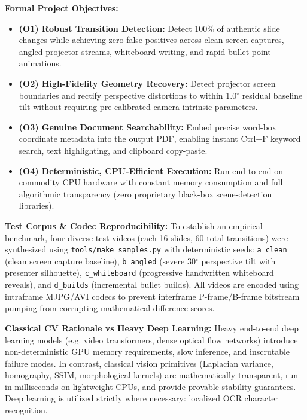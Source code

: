 \documentclass[10pt,a4paper]{article}
\begin{document}
\textbf{Formal Project Objectives:}
\begin{itemize}[leftmargin=6mm, itemsep=1pt, topsep=2pt]
  \item \textbf{(O1) Robust Transition Detection:} Detect 100\% of authentic slide changes while achieving zero false positives across clean screen captures, angled projector streams, whiteboard writing, and rapid bullet-point animations.
  \item \textbf{(O2) High-Fidelity Geometry Recovery:} Detect projector screen boundaries and rectify perspective distortions to within 1.0$^\circ$ residual baseline tilt without requiring pre-calibrated camera intrinsic parameters.
  \item \textbf{(O3) Genuine Document Searchability:} Embed precise word-box coordinate metadata into the output PDF, enabling instant Ctrl+F keyword search, text highlighting, and clipboard copy-paste.
  \item \textbf{(O4) Deterministic, CPU-Efficient Execution:} Run end-to-end on commodity CPU hardware with constant memory consumption and full algorithmic transparency (zero proprietary black-box scene-detection libraries).
\end{itemize}

\textbf{Test Corpus \& Codec Reproducibility:} To establish an empirical benchmark, four diverse test videos (each 16 slides, 60 total transitions) were synthesized using \texttt{tools/make\_samples.py} with deterministic seeds: \texttt{a\_clean} (clean screen capture baseline), \texttt{b\_angled} (severe 30$^\circ$ perspective tilt with presenter silhouette), \texttt{c\_whiteboard} (progressive handwritten whiteboard reveals), and \texttt{d\_builds} (incremental bullet builds). All videos are encoded using intraframe MJPG/AVI codecs to prevent interframe P-frame/B-frame bitstream pumping from corrupting mathematical difference scores.

\textbf{Classical CV Rationale vs Heavy Deep Learning:} Heavy end-to-end deep learning models (e.g. video transformers, dense optical flow networks) introduce non-deterministic GPU memory requirements, slow inference, and inscrutable failure modes. In contrast, classical vision primitives (Laplacian variance, homography, SSIM, morphological kernels) are mathematically transparent, run in milliseconds on lightweight CPUs, and provide provable stability guarantees. Deep learning is utilized strictly where necessary: localized OCR character recognition.

\end{document}
